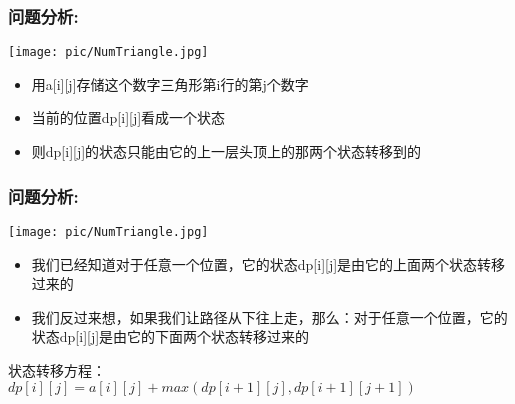 \documentclass{beamer}
\begin{document}
\begin{frame}[fragile]
\frametitle{问题分析:}

\begin{minipage}[b]{0.30\linewidth}
	\texttt{[image: pic/NumTriangle.jpg]}
\end{minipage}
\hfill
\begin{minipage}[b]{0.55\linewidth}
	\iffalse
	三角形的行数最大是100，暴力的时间复杂度是 $O(2^n)$,而 $2^{100}$ 肯定会超时\\
	在不考虑记忆话搜索的情况下，我们需要怎么解决这个问题呢？\\
	我们以a[i][j]表示这个数字三角形第i行j列上的数字
	\fi
	\begin{itemize}
		\item 用a[i][j]存储这个数字三角形第i行的第j个数字
		\item 当前的位置dp[i][j]看成一个状态
		\item 则dp[i][j]的状态只能由它的上一层头顶上的那两个状态转移到的
	\end{itemize}
	
\end{minipage}
\end{frame}

\begin{frame}[fragile]
\frametitle{问题分析:}

\begin{minipage}[b]{0.30\linewidth}
	\texttt{[image: pic/NumTriangle.jpg]}
\end{minipage}
\hfill
\begin{minipage}[b]{0.55\linewidth}
\begin{itemize}
	\item 我们已经知道对于任意一个位置，它的状态dp[i][j]是由它的上面两个状态转移过来的\\
	\item 我们反过来想，如果我们让路径从下往上走，那么：对于任意一个位置，它的状态dp[i][j]是由它的下面两个状态转移过来的
\end{itemize}

\end{minipage} 
\begin{block}{状态转移方程：}
  $dp[i][j] = a[i][j] + max(dp[i+1][j], dp[i+1][j+1])$
\end{block}

\end{frame}
\end{document}
